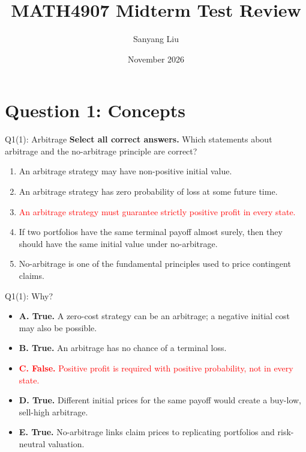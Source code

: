 \documentclass{beamer}
\title{MATH4907 Midterm Test Review}
\author{Sanyang Liu}
\date{November 2026}
\newcommand{\wrong}[1]{\textcolor{red}{#1}}
\begin{document}
\maketitle

\section{Question 1: Concepts}

\begin{frame}{Q1(1): Arbitrage}
\small
\textbf{Select all correct answers.} Which statements about arbitrage
and the no-arbitrage principle are correct?
\begin{enumerate}
\item[A.] An arbitrage strategy may have non-positive initial value.
\item[B.] An arbitrage strategy has zero probability of loss at some future time.
\item[\wrong{C.}] \wrong{An arbitrage strategy must guarantee strictly positive profit in every state.}
\item[D.] If two portfolios have the same terminal payoff almost surely,
then they should have the same initial value under no-arbitrage.
\item[E.] No-arbitrage is one of the fundamental principles used to price
contingent claims.
\end{enumerate}
\end{frame}

\begin{frame}{Q1(1): Why?}
\small
\begin{itemize}
\item \textbf{A. True.} A zero-cost strategy can be an arbitrage;
a negative initial cost may also be possible.
\item \textbf{B. True.} An arbitrage has no chance of a terminal loss.
\item \wrong{\textbf{C. False.} Positive profit is required with positive
probability, not in every state.}
\item \textbf{D. True.} Different initial prices for the same payoff
would create a buy-low, sell-high arbitrage.
\item \textbf{E. True.} No-arbitrage links claim prices to replicating
portfolios and risk-neutral valuation.
\end{itemize}
\end{frame}
\end{document}
